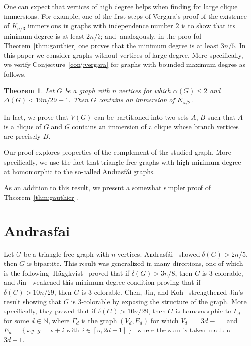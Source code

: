 \documentclass[a4paper,12pt]{article}
\newtheorem{theorem}{Theorem}
\begin{document}
One can expect that vertices of high degree helps when finding for large clique immersions.
For example, one of the first steps of Vergara's proof of the existence of \(K_{n/3}\) immersions
in graphs with independence number \(2\) is to show that its minimum degree is at least \(2n/3\);
and, analogously, in the proo fof Theorem~\ref{thm:gauthier} one proves that the minimum degree is at least \(3n/5\). 
In this paper we consider graphs without vertices of large degree.
More specifically, we verify Conjecture~\ref{conj:vergara} for graphs with bounded maximum degree
as follows.

\begin{theorem}\label{thm:main}
Let \(G\) be a graph with \(n\) vertices for which \(\alpha(G) \leq 2\) 
and \(\Delta(G) < 19n/29 - 1\).
Then \(G\) contains an immersion of \(K_{n/2}\).
\end{theorem}

In fact, we prove that \(V(G)\) can be partitioned into two sets \(A\), \(B\)
such that \(A\) is a clique of \(G\) and \(G\) contains an immersion of a clique whose
branch vertices are precisely \(B\).

Our proof explores properties of the complement of the studied graph.
More specifically, we use the fact that triangle-free graphs 
with high minimum degree at homomorphic to the so-called Andrasfái graphs.

As an addition to this result, we present a somewhat simpler proof of Theorem~\ref{thm:gauthier}.

\section{Andrasfai}



\newcommand{\andrasfai}{Andrasf\'ai}

Let \(G\) be a triangle-free graph with \(n\) vertices.
\andrasfai~\cite{andrasfal1964graphentheoretische} showed \(\delta(G) > 2n/5\),
then \(G\) is bipartite.
This result was generalized in many directions,
one of which is the following.
%
H{\"a}ggkvist~\cite{haggkvist1982odd} proved that if \(\delta(G) > 3n/8\), 
then \(G\) is \(3\)-colorable,
%
and Jin~\cite{jin1995triangle} weakened this minimum degree condition 
proving that if \(\delta(G) > 10n/29\), 
then \(G\) is \(3\)-colorable.
%
Chen, Jin, and Koh~\cite{chen1997triangle} strengthened Jin's result
showing that \(G\) is \(3\)-colorable by exposing the structure of the graph.
More specifically, they proved that if \(\delta(G) > 10n/29\),
then \(G\) is homomorphic to \(\Gamma_d\) for some \(d\in\mathbb{N}\),
where \(\Gamma_d\) is the graph \((V_d,E_d)\)
for which \(V_d = [3d-1]\) and \(E_d = \left\{xy : y = x + i \text{ with } i \in [d,2d-1]\right\}\),
where the sum is taken modulo \(3d-1\).
\end{document}
